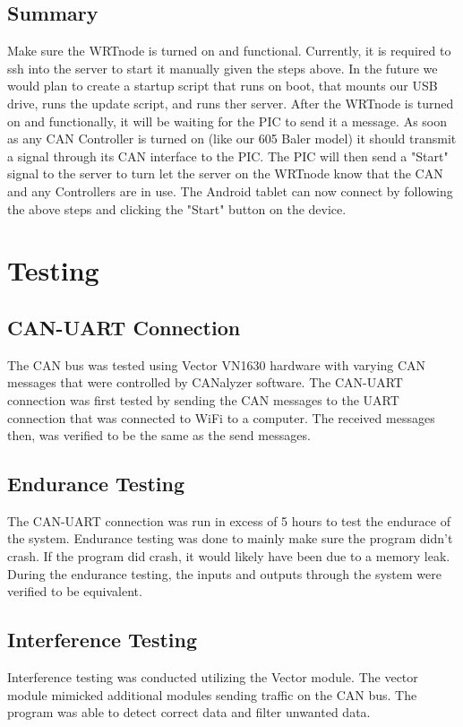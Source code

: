 \documentclass[paper=a4, fontsize=11pt]{scrartcl}
\numberwithin{equation}{section}		%
\numberwithin{figure}{section}			%
\numberwithin{table}{section}				%
\begin{document}
 \subsection{Summary} 
 Make sure the WRTnode is turned on and functional. Currently, it is required to ssh into the server to start it manually given the steps above. In the future we would plan to create a startup script that runs on boot, that mounts our USB drive, runs the update script, and runs ther server. After the WRTnode is turned on and functionally, it will be waiting for the PIC to send it a  message. As soon as any CAN Controller is turned on (like our 605 Baler model) it should transmit a signal through its CAN interface to the PIC. The PIC will then send a "Start" signal to the server to turn let the server on the WRTnode know that the CAN and any Controllers are in use. The Android tablet can now connect by following the above steps and clicking the "Start" button on the device. \\

 \pagebreak
\section{Testing}
\subsection{CAN-UART Connection}
The CAN bus was tested using Vector VN1630 hardware with varying CAN messages that were  controlled by CANalyzer software. The CAN-UART connection was first tested by sending the CAN messages to the UART connection that was connected to 	WiFi to a computer. The received messages then, was verified to be the same as the send messages. \\

\subsection{Endurance Testing}
The CAN-UART connection was run in excess of 5 hours to test the endurace of the system. Endurance testing was done to mainly make sure the program didn't crash. If the program did crash, it would likely have been due to a memory leak. During the endurance testing, the inputs and outputs through the system were verified to be equivalent. \\

\subsection{Interference Testing}
Interference testing was conducted utilizing the Vector module. The vector module mimicked additional modules sending traffic on the CAN bus. The program was able to detect correct data and filter unwanted data. \\
\end{document}
